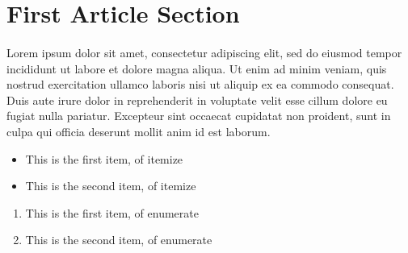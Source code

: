 \section{First Article Section}
    \paragraph{}Lorem ipsum dolor sit amet, consectetur adipiscing elit, sed do eiusmod tempor incididunt ut labore et dolore magna aliqua.
    Ut enim ad minim veniam, quis nostrud exercitation ullamco laboris nisi ut aliquip ex ea commodo consequat. Duis aute irure dolor in
    reprehenderit in voluptate velit esse cillum dolore eu fugiat nulla pariatur. Excepteur sint occaecat cupidatat non proident, sunt in
    culpa qui officia deserunt mollit anim id est laborum. \cite{article-full}

    \begin{itemize}
        \item This is the first item, of itemize
        \item This is the second item, of itemize
    \end{itemize}
    
    \begin{enumerate}
        \item This is the first item, of enumerate
        \item This is the second item, of enumerate
    \end{enumerate}
    
\newpage
